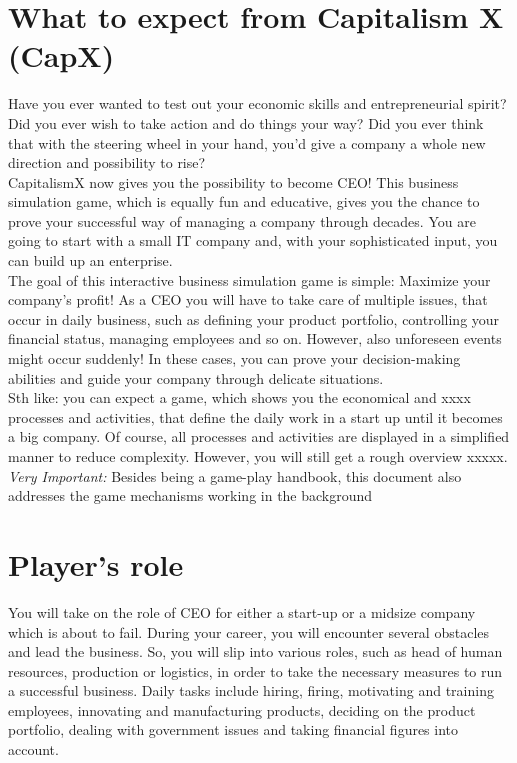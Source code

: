 \documentclass[11pt,titlepage,oneside,openany]{book}
\begin{document}
\section{What to expect from Capitalism X (CapX)}
Have you ever wanted to test out your economic skills and entrepreneurial spirit? Did you ever wish to take action and do things your way? Did you ever think that with the steering wheel in your hand, you'd give a company a whole new direction and possibility to rise? \\
CapitalismX now gives you the possibility to become CEO! This business simulation game, which is equally fun and educative, gives you the chance to prove your successful way of managing a company through decades. You are going to start with a small IT company and, with your sophisticated input, you can build up an enterprise.\\
The goal of this interactive business simulation game is simple: Maximize your company's profit! As a CEO you will have to take care of multiple issues, that occur in daily business, such as defining your product portfolio, controlling your financial status, managing employees and so on. However, also unforeseen events might occur suddenly! In these cases, you can prove your decision-making abilities and guide your company through delicate situations. \\
Sth like: you can expect a game, which shows you the economical and xxxx processes and activities, that define the daily work in a start up until it becomes a big company. Of course, all processes and activities are displayed in a simplified manner to reduce complexity. However, you will still get a rough overview xxxxx. \\
\emph{Very Important:} Besides being a game-play handbook, this document also addresses the game mechanisms working in the background
 
\section{Player's role}
You will take on the role of CEO for either a start-up or a midsize company which is about to fail. During your career, you will encounter several obstacles and lead the business. So, you will slip into various roles, such as head of human resources, production or logistics, in order to take the necessary measures to run a successful business. Daily tasks include hiring, firing, motivating and training employees, innovating and manufacturing products, deciding on the product portfolio, dealing with government issues and taking financial figures into account. 
\end{document}

